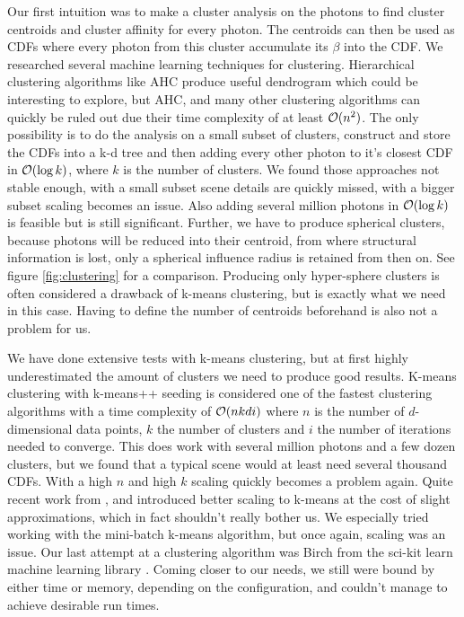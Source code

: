 Our first intuition was to make a cluster analysis on the photons to find cluster centroids and cluster affinity for every photon. The centroids can then be used as CDFs where every photon from this cluster accumulate its $\beta$ into the CDF. We researched several machine learning techniques for clustering. Hierarchical clustering algorithms like AHC produce useful dendrogram which could be interesting to explore, but AHC, and many other clustering algorithms can quickly be ruled out due their time complexity of at least $\mathcal{O}(n^2)$. The only possibility is to do the analysis on a small subset of clusters, construct and store the CDFs into a k-d tree and then adding every other photon to it's closest CDF in $\mathcal{O}(\log k)$, where $k$ is the number of clusters. We found those approaches not stable enough, with a small subset scene details are quickly missed, with a bigger subset scaling becomes an issue. Also adding several million photons in $\mathcal{O}(\log k)$ is feasible but is still significant. Further, we have to produce spherical clusters, because photons will be reduced into their centroid, from where structural information is lost, only a spherical influence radius is retained from then on. See figure \ref{fig:clustering} for a comparison. Producing only hyper-sphere clusters is often considered a drawback of k-means clustering, but is exactly what we need in this case. Having to define the number of centroids beforehand is also not a problem for us.

We have done extensive tests with k-means clustering, but at first highly underestimated the amount of clusters we need to produce good results. K-means clustering with k-means++ seeding \cite{DBLP:conf/soda/ArthurV07} is considered one of the fastest clustering algorithms with a time complexity of $\mathcal{O}(nkdi)$ where $n$ is the number of $d$-dimensional data points, $k$ the number of clusters and $i$ the number of iterations needed to converge. This does work with several million photons and a few dozen clusters, but we found that a typical scene would at least need several thousand CDFs. With a high $n$ and high $k$ scaling quickly becomes a problem again. Quite recent work from \cite{DBLP:conf/kse/HieuM14}, \cite{DBLP:journals/tpds/XuQLMLL14} and \cite{DBLP:conf/www/Sculley10} introduced better scaling to k-means at the cost of slight approximations, which in fact shouldn't really bother us. We especially tried working with the mini-batch k-means algorithm, but once again, scaling was an issue. Our last attempt at a clustering algorithm was Birch \cite{DBLP:conf/sigmod/ZhangRL96} from the sci-kit learn machine learning library \cite{scikit-learn}. Coming closer to our needs, we still were bound by either time or memory, depending on the configuration, and couldn't manage to achieve desirable run times.

